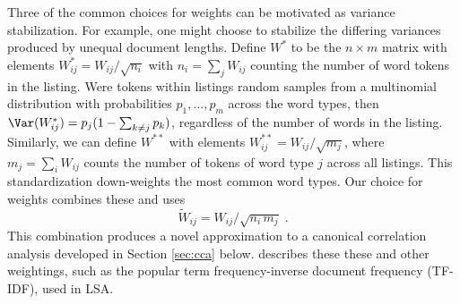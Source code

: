 \documentclass[12pt]{article}
\begin{document}
 Three of the common choices for weights can be motivated as variance stabilization. 
 For example, one might choose to stabilize the differing variances produced by 
 unequal document lengths.  Define
 ${W}^{*}$ to be the $n \times m$ matrix with elements ${W}^{*}_{ij} =
 W_{ij}/\sqrt{n_i}$ with $n_i = \sum_j W_{ij}$ counting the number of word
 tokens in the \ith listing.  Were tokens within listings random samples from a
 multinomial distribution with probabilities $p_{1}, \ldots, p_{m}$ across the word types,
 then $\Var({W}^{*}_{ij}) = p_j(1-\sum_{k\ne j} p_k)$, regardless of the
 number of words in the listing.  Similarly, we can define $W^{**}$ with elements
 $W^{**}_{ij} = W_{ij}/\sqrt{m_j}$, where $m_j = \sum_i W_{ij}$ counts the
 number of tokens of word type $j$ across all listings. This standardization
 down-weights the most common word types.  Our choice for weights combines these and uses
  \begin{equation}
   \widetilde{W}_{ij} = W_{ij}/\sqrt{n_i\,m_j} \;.
  \label{eq:Wtij}
  \end{equation}
  This combination produces a novel approximation to a canonical correlation analysis developed in Section \ref{sec:cca} below. \citet{turney10} describes these these and other weightings, such as the popular term frequency-inverse document
 frequency (TF-IDF),  used in LSA. 
  
  
 
\end{document}
